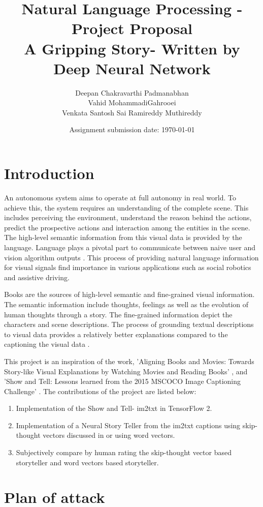 \documentclass{article}
\title{Natural Language Processing - Project Proposal\\ A Gripping Story- Written by Deep Neural Network}
\author{Deepan Chakravarthi Padmanabhan\\Vahid MohammadiGahrooei\\Venkata Santosh Sai Ramireddy Muthireddy}
\date{Assignment submission date: \today}
\begin{document}
\maketitle
\section{Introduction}
An autonomous system aims to operate at full autonomy in real world. To achieve this, the system requires an understanding of the complete scene. This includes perceiving the environment, understand the reason behind the actions, predict the prospective actions and interaction among the entities in the scene. The high-level semantic information from this visual data is provided by the language. Language plays a pivotal part to communicate between naive user and vision algorithm outputs \cite{movie-story}. This process of providing natural language information for visual signals find importance in various applications such as social robotics and assistive driving. 

Books are the sources of high-level semantic and fine-grained visual information. The semantic information include thoughts, feelings as well as the evolution of human thoughts through a story. The fine-grained information depict the characters and scene descriptions. The process of grounding textual descriptions to visual data provides a relatively better explanations compared to the captioning the visual data \cite{movie-story}. 

This project is an inspiration of the work, 'Aligning Books and Movies: Towards Story-like Visual Explanations by Watching Movies and Reading Books' \cite{movie-story}, and 'Show and Tell: Lessons learned from the 2015 MSCOCO Image Captioning Challenge' \cite{showandtell}. The contributions of the project are listed below:
\begin{enumerate}
    \item Implementation of the Show and Tell- im2txt in TensorFlow 2. 
    \item Implementation of a Neural Story Teller from the im2txt captions using skip-thought vectors discussed in \cite{movie-story} or using word vectors.
    \item Subjectively compare by human rating the skip-thought vector based storyteller and word vectors based storyteller.
\end{enumerate}

\section{Plan of attack}
\end{document}
